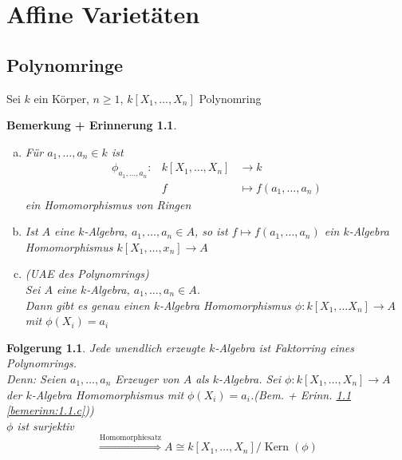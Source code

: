 \documentclass[a4paper,12pt]{report}
\theoremstyle{break}
\newtheorem{BemErinn}[Def]{Bemerkung + Erinnerung}
\newtheorem{Folg}[Def]{Folgerung}
\theoremstyle{nonumberbreak}
\theoremstyle{nonumberplain}
\DeclareMathOperator{\Kern}{Kern}
\begin{document}

\chapter{Affine Variet\"aten}

\section{Polynomringe}

Sei $k$ ein K\"orper, $n \geq 1$, $k[X_1,\dots,X_n]$ Polynomring

\begin{BemErinn}\label{bemerinn:1.1}
\begin{enumerate}[a)]
\item F\"ur $a_1, \dots, a_n \in k$ ist
	\[\begin{array}{lrl}
		\phi_{a_1,\dots,a_n}: &k[X_1, \dots, X_n] & \to k \\
		&f &\mapsto f(a_1, \dots, a_n)
	\end{array}\]
	ein Homomorphismus von Ringen
	
\item Ist $A$ eine $k$-Algebra, $a_1,\dots, a_n \in A$, so ist $f \mapsto f(a_1, \dots,a_n)$ ein $k$-Algebra Homomorphismus $k[X_1,\dots,x_n] \to A$
	
\item (UAE des Polynomrings)\\
	Sei $A$ eine $k$-Algebra, $a_1,\dots,a_n\in A$.\\
	Dann gibt es genau einen $k$-Algebra Homomorphismus $\phi:k[X_1,\dots X_n] \to A$ mit $\phi(X_i) = a_i$\label{bemerinn:1.1.c}
\end{enumerate}
\end{BemErinn}

\begin{Folg}\label{folg1.2}
Jede unendlich erzeugte $k$-Algebra ist Faktorring eines Polynomrings.\\
	\emph{Denn:} Seien $a_1,\dots, a_n$ Erzeuger von $A$ als $k$-Algebra. Sei $\phi:k[X_1,\dots,X_n] \to A$ \emph{der} $k$-Algebra Homomorphismus mit $\phi(X_i) = a_i$.(Bem. + Erinn. \ref{bemerinn:1.1} \ref{bemerinn:1.1.c}))\\
	$\phi$ ist surjektiv \[\overset{\textrm{Homomorphiesatz}}{\Longrightarrow} A \cong k[X_1,\dots, X_n]/\Kern(\phi)\]
\end{Folg}
\end{document}
